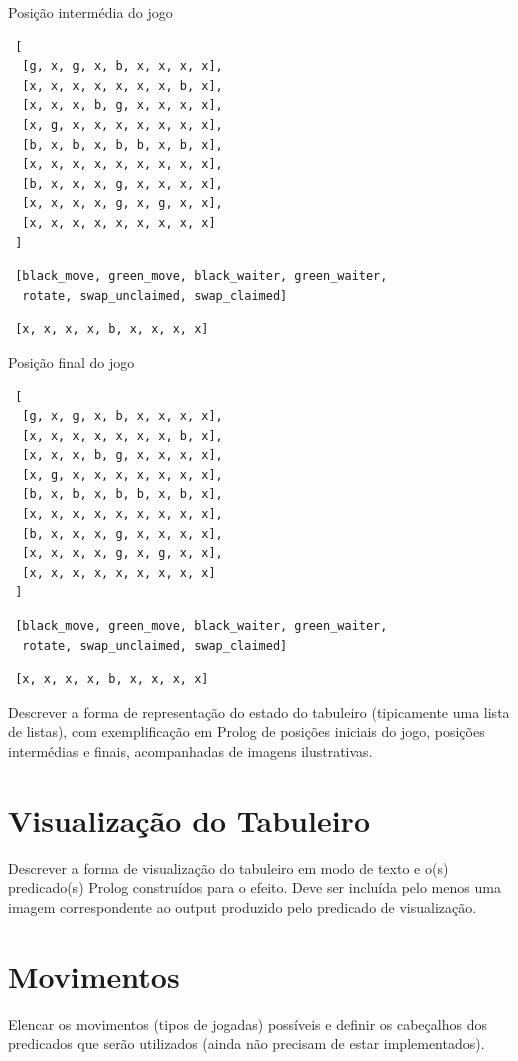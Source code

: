 \documentclass[a4paper]{article}
\begin{document}
Posição intermédia do jogo
\begin{lstlisting}
 [
  [g, x, g, x, b, x, x, x, x],
  [x, x, x, x, x, x, x, b, x],
  [x, x, x, b, g, x, x, x, x],
  [x, g, x, x, x, x, x, x, x],
  [b, x, b, x, b, b, x, b, x],
  [x, x, x, x, x, x, x, x, x],
  [b, x, x, x, g, x, x, x, x],
  [x, x, x, x, g, x, g, x, x],
  [x, x, x, x, x, x, x, x, x]
 ]
\end{lstlisting}

\begin{lstlisting}
 [black_move, green_move, black_waiter, green_waiter, 
  rotate, swap_unclaimed, swap_claimed]
\end{lstlisting}

\begin{lstlisting}
 [x, x, x, x, b, x, x, x, x]
\end{lstlisting}

Posição final do jogo
\begin{lstlisting}
 [
  [g, x, g, x, b, x, x, x, x],
  [x, x, x, x, x, x, x, b, x],
  [x, x, x, b, g, x, x, x, x],
  [x, g, x, x, x, x, x, x, x],
  [b, x, b, x, b, b, x, b, x],
  [x, x, x, x, x, x, x, x, x],
  [b, x, x, x, g, x, x, x, x],
  [x, x, x, x, g, x, g, x, x],
  [x, x, x, x, x, x, x, x, x]
 ]
\end{lstlisting}

\begin{lstlisting}
 [black_move, green_move, black_waiter, green_waiter, 
  rotate, swap_unclaimed, swap_claimed]
\end{lstlisting}

\begin{lstlisting}
 [x, x, x, x, b, x, x, x, x]
\end{lstlisting}



Descrever a forma de representação do estado do tabuleiro (tipicamente uma lista de listas), com exemplificação em Prolog de posições iniciais do jogo, posições intermédias e finais, acompanhadas de imagens ilustrativas.


\section{Visualização do Tabuleiro}

Descrever a forma de visualização do tabuleiro em modo de texto e o(s) predicado(s) Prolog construídos para o efeito.
Deve ser incluída pelo menos uma imagem correspondente ao output produzido pelo predicado de visualização.


\section{Movimentos}

Elencar os movimentos (tipos de jogadas) possíveis e definir os cabeçalhos dos predicados que serão utilizados (ainda não precisam de estar implementados).
\end{document}
